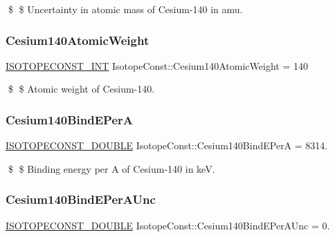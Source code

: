 \$ \$ Uncertainty in atomic mass of Cesium-\/140 in amu. \mbox{\label{group___isotope_const-_cesium-_cs140_ga3d7a2224cfb3d3ac23baa0d04511cccb}} 
\subsubsection{\texorpdfstring{Cesium140\+Atomic\+Weight}{Cesium140AtomicWeight}}
{\footnotesize\ttfamily \mbox{\hyperlink{group___isotope_const-_macros_ga5f18360b3e99483a35c32d789e62621c}{I\+S\+O\+T\+O\+P\+E\+C\+O\+N\+S\+T\+\_\+\+I\+NT}} Isotope\+Const\+::\+Cesium140\+Atomic\+Weight = 140}

\$ \$ Atomic weight of Cesium-\/140. \mbox{\label{group___isotope_const-_cesium-_cs140_ga8987e84b9b27cdf9665dbcacb0dc3e69}} 
\subsubsection{\texorpdfstring{Cesium140\+Bind\+E\+PerA}{Cesium140BindEPerA}}
{\footnotesize\ttfamily \mbox{\hyperlink{group___isotope_const-_macros_ga8f45a7272ce02c0b4c65c44636ed719a}{I\+S\+O\+T\+O\+P\+E\+C\+O\+N\+S\+T\+\_\+\+D\+O\+U\+B\+LE}} Isotope\+Const\+::\+Cesium140\+Bind\+E\+PerA = 8314.}

\$ \$ Binding energy per A of Cesium-\/140 in keV. \mbox{\label{group___isotope_const-_cesium-_cs140_gaed907c747199a246279e825a156a7f87}} 
\subsubsection{\texorpdfstring{Cesium140\+Bind\+E\+Per\+A\+Unc}{Cesium140BindEPerAUnc}}
{\footnotesize\ttfamily \mbox{\hyperlink{group___isotope_const-_macros_ga8f45a7272ce02c0b4c65c44636ed719a}{I\+S\+O\+T\+O\+P\+E\+C\+O\+N\+S\+T\+\_\+\+D\+O\+U\+B\+LE}} Isotope\+Const\+::\+Cesium140\+Bind\+E\+Per\+A\+Unc = 0.}

